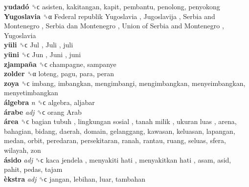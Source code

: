 \textbf{yudadó} ␝ϲ  asisten, kakitangan, kapit, pembantu, penolong, penyokong  \\
\textbf{Yugoslavia} ␝α   Federal republik Yugoslavia ,  Jugoslavija ,  Serbia and Montenegro ,  Serbia dan Montenegro ,  Union of Serbia and Montenegro ,  Yugoslavia   \\
\textbf{yüli} ␝ϲ   Jul ,  Juli , juli  \\
\textbf{yüni} ␝ϲ   Jun ,  Juni , juni  \\
\textbf{zjampaña} ␝ϲ  champagne, sampanye  \\
\textbf{zolder} ␝α  loteng, pagu, para, peran  \\
\textbf{zoya} ␝ϲ  imbang, imbangkan, mengimbangi, mengimbangkan, menyeimbangkan, menyetimbangkan  \\
\textbf{álgebra} \emph{n}  ␝ϲ  algebra, aljabar  \\
\textbf{árabe} \emph{adj}  ␝ϲ   orang Arab   \\
\textbf{área} ␝ϲ   bagian tubuh ,  lingkungan sosial ,  tanah milik ,  ukuran luas , arena, bahagian, bidang, daerah, domain, gelanggang, kawasan, keluasan, lapangan, medan, orbit, peredaran, persekitaran, ranah, rantau, ruang, seluas, sfera, wilayah, zon  \\
\textbf{ásido} \emph{adj}  ␝ϲ   kaca jendela ,  menyakiti hati ,  menyakitkan hati , asam, asid, pahit, pedas, tajam  \\
\textbf{èkstra} \emph{adj}  ␝ϲ  jangan, lebihan, luar, tambahan  \\
